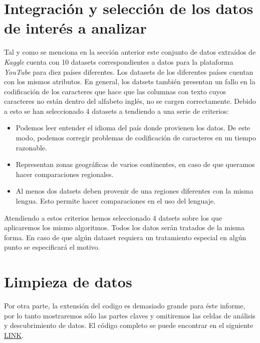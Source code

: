 \documentclass[a4paper,12pt]{article}
\begin{document}
\section{Integraci\'on y selecci\'on de los datos de inter\'es a analizar}

Tal y como se menciona en la secci\'on anterior este conjunto de datos extra\'idos de {\itshape Kaggle} cuenta con 10 datasets correspondientes a datos para la plataforma {\itshape YouTube} para diez pa\'ises diferentes. Los datasets de los diferentes pa\'ises cuentan con los mismos atributos. En general, los datsets tambi\'en presentan un fallo en la codificaci\'on de los caracteres que hace que las columnas con texto cuyos caracteres no est\'an dentro del alfabeto ingl\'es, no se cargen correctamente. Debido a esto se han seleccionado 4 datasets a tendiendo a una serie de criterios:

\begin{itemize}

\item Podemos leer entender el idioma del pa\'is donde provienen los datos. De este modo, podemos corregir problemas de codificaci\'on de caracteres en un tiempo razonable.
\item Representan zonas geogr\'aficas de varios continentes, en caso de que queramos hacer comparaciones regionales. 
\item Al menos dos datsets deben provenir de una regiones diferentes con la misma lengua. Esto permite hacer comparaciones en el uso del lenguaje.


\end{itemize} 

Atendiendo a estos criterios hemos seleccionado 4 datsets sobre  los que aplicaremos los mismo algoritmos. Todos los datos ser\'an tratados de la misma forma. En caso de que alg\'un dataset requiera un tratamiento especial en alg\'un punto se especificar\'a el motivo.

\section[item_limpieza]{Limpieza de datos}


Por otra parte, la extensi\'on del codigo es demasiado grande para \'este informe, por lo tanto mostraremos s\'olo las partes claves y omitiremos las celdas de an\'alisis y descubrimiento de datos. El c\'odigo completo se puede encontrar en el siguiente \href{https://github.com/b-suarez/youtube_stats_analysis}{LINK}.
\end{document}
